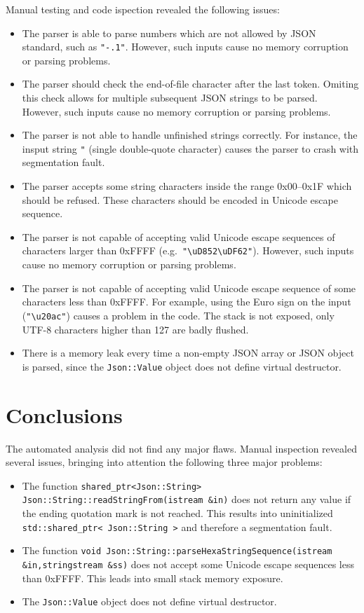 \documentclass[11pt]{article}
\begin{document}
Manual testing and code ispection revealed the following issues:
\begin{itemize}[itemsep=0pt]
\item The parser is able to parse numbers which are not allowed by JSON standard, such as \texttt{"-.1"}. However, such inputs cause no memory corruption or parsing problems.
\item The parser should check the end-of-file character after the last token. Omiting this check allows for multiple subsequent JSON strings to be parsed. However, such inputs cause no memory corruption or parsing problems.
\item The parser is not able to handle unfinished strings correctly. For instance, the insput string \texttt{"} (single double-quote character) causes the parser to crash with segmentation fault.
\item The parser accepts some string characters inside the range 0x00--0x1F which should be refused. These characters should be encoded in Unicode escape sequence.
\item The parser is not capable of accepting valid Unicode escape sequences of characters larger than 0xFFFF (e.g.\ \texttt{"\textbackslash{}uD852\textbackslash{}uDF62"}). However, such inputs cause no memory corruption or parsing problems.
\item The parser is not capable of accepting valid Unicode escape sequence of some characters less than 0xFFFF. For example, using the Euro sign on the input (\texttt{"\textbackslash{}u20ac"}) causes a problem in the code. The stack is not exposed, only UTF-8 characters higher than 127 are badly flushed.
\item There is a memory leak every time a non-empty JSON array or JSON object is parsed, since the \texttt{Json::Value} object does not define virtual destructor.
\end{itemize}

\section{Conclusions}

The automated analysis did not find any major flaws. Manual inspection revealed several issues, bringing into attention the following three major problems:
\begin{itemize}[itemsep=0pt]
\item The function \texttt{shared\_ptr<Json::String> Json::String::readStringFrom(istream \&in)} does not return any value if the ending quotation mark is not reached. This results into uninitialized \texttt{std::shared\_ptr< Json::String >} and therefore a segmentation fault.
\item The function \texttt{void Json::String::parseHexaStringSequence(istream \&in,stringstream \&ss)} does not accept some Unicode escape sequences less than 0xFFFF. This leads into small stack memory exposure.
\item The \texttt{Json::Value} object does not define virtual destructor.
\end{itemize}
\end{document}
